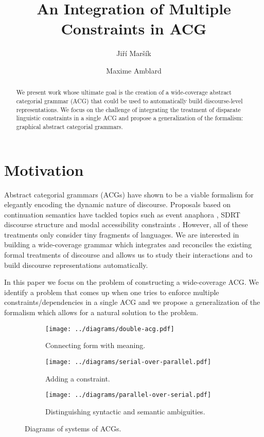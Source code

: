 \documentclass[twocolumn]{article}
\begin{document}
\title{An Integration of Multiple Constraints in ACG}
\author{Jiří Maršík \and Maxime Amblard}
\maketitle

\begin{abstract}
  We present work whose ultimate goal is the creation of a wide-coverage
  abstract categorial grammar (ACG) that could be used to automatically
  build discourse-level representations. We focus on the challenge of
  integrating the treatment of disparate linguistic constraints in a
  single ACG and propose a generalization of the formalism: graphical
  abstract categorial grammars.
\end{abstract}


\section{Motivation}

Abstract categorial grammars (ACGs) have shown to be a viable formalism
for elegantly encoding the dynamic nature of discourse. Proposals based
on continuation semantics \cite{de2006towards} have tackled topics such
as event anaphora \cite{qian2011event}, SDRT discourse structure
\cite{asher2011sdrt} and modal accessibility constraints
\cite{asher2011montagovian}. However, all of these treatments only
consider tiny fragments of languages. We are interested in building a
wide-coverage grammar which integrates and reconciles the existing
formal treatments of discourse and allows us to study their interactions
and to build discourse representations automatically.

In this paper we focus on the problem of constructing a wide-coverage
ACG. We identify a problem that comes up when one tries to enforce
multiple constraints/dependencies in a single ACG and we propose a
generalization of the formalism which allows for a natural solution to
the problem.


\begin{figure*}[t]
  \centering
  \begin{subfigure}[b]{0.25\textwidth}
    \centering
    \texttt{[image: ../diagrams/double-acg.pdf]}
    \caption{\label{fig:acg-comp-basic} Connecting form with meaning.}
  \end{subfigure}
  \qquad
  \begin{subfigure}[b]{0.25\textwidth}
    \centering
    \texttt{[image: ../diagrams/serial-over-parallel.pdf]}
    \caption{\label{fig:acg-comp-constr} Adding a constraint.}
  \end{subfigure}
  \qquad
  \begin{subfigure}[b]{0.25\textwidth}
    \centering
    \texttt{[image: ../diagrams/parallel-over-serial.pdf]}
    \caption{\label{fig:acg-comp-sem} Distinguishing syntactic and
      semantic ambiguities.}
  \end{subfigure}
  \caption{\label{fig:acg-comp} Diagrams of systems of ACGs.}
\end{figure*}
\end{document}
